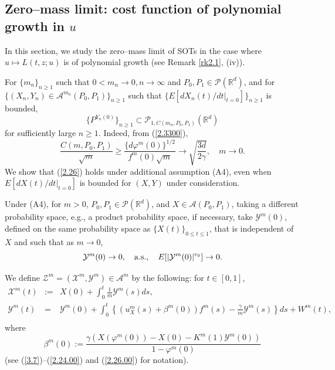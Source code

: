 \documentclass[12pt]{article}
\begin{document}
\subsection{Zero--mass limit: cost function of polynomial growth in $u$}

In this section, we study the zero--mass limit of SOTs in the case where $u\mapsto  L(t,z;u)$ is of  polynomial growth (see Remark \ref{rk2.1}, (iv)).

For $\{m_n\}_{n\ge 1}$ such that $0<m_n\to 0, n\to\infty$ and $P_0,P_1\in\mathcal{P}(\mathbb{R}^d)$, and for $\{(X_n, Y_n)\in \mathcal{A}^{m_n}(P_0,P_1)\}_{n\ge 1}$ such that $\{E[dX_n(t)/dt|_{t=0}]\}_{n\ge 1}$ is bounded, 
$$\{P^{Y_n(0)}\}_{n\ge 1}\subset\mathcal{P}_{1,C(m_n,P_0,P_1)}(\mathbb{R}^d)$$ for sufficiently large $n\ge 1$.
Indeed, from (\ref{2.3300}),
\begin{equation}
\frac{C(m,P_0,P_1)}{\sqrt m}
\ge\frac{\{d\varphi^m(0)\}^{1/2}}{f^m(0)\sqrt m} 
\to \sqrt{\frac{3d}{2\gamma}},\quad m\to 0.
\end{equation}
We show that (\ref{2.26}) holds under additional assumption (A4),
even when $E[dX(t)/dt|_{t=0}]$ is bounded for $(X,Y)$ under consideration.


Under (A4),
for $m>0$, $P_0,P_1\in\mathcal{P}(\mathbb{R}^d)$, and $X\in \mathcal{A}(P_0,P_1)$, 
taking a different probability space, e.g., a product probability space,  if necessary, take 
$\mathcal{Y}^m(0)$, defined on the same probability space as $\{X(t)\}_{0\le t\le 1}$,
that is independent of $X$ and 
such that as $m\to 0$,
\begin{equation}\label{2.42.0}
\mathcal{Y}^m(0)\to 0, \quad {\rm a.s.},\quad 
E[|\mathcal{Y}^m(0)|^{r_0}]\to 0.
\end{equation}


We define $\mathcal{Z}^m=(\mathcal{X}^m, \mathcal{Y}^m)\in \mathcal{A}^{m}$ by the following: for $t\in [0,1]$,
\begin{eqnarray}
\mathcal{X}^m(t)&:=&X(0)+\int_0^t \frac{1}{m}\mathcal{Y}^m(s)ds, \label{2.42}
\\
\mathcal{Y}^m(t)&=&\mathcal{Y}^m(0)+
\int_0^t \left\{\left(u_{X}^m(s)+\beta^m(0)\right)f^m(s)- \frac{\gamma}{m}\mathcal{Y}^m(s)\right\}ds
+W^m(t),\nonumber\\
\label{2.43}
\end{eqnarray}
where
\begin{equation}\label{2.44}
\beta^m(0):=\frac{\gamma(X(\varphi^m(0))-X(0)-K^m(1)\mathcal{Y}^m(0))}{1-\varphi ^m(0)}
\end{equation}
(see (\ref{3.7})--(\ref{2.24.00}) and (\ref{2.26.00}) for notation).
\end{document}
